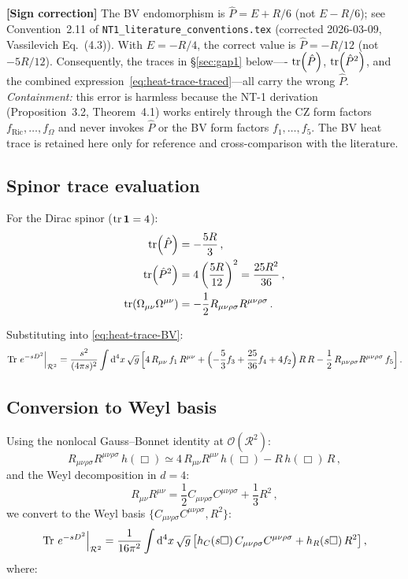 \documentclass[11pt,a4paper]{article}
\newcommand{\Id}{\mathbf{1}}
\newcommand{\Ricsq}{R_{\mu\nu}R^{\mu\nu}}
\newcommand{\Rsq}{R_{\mu\nu\rho\sigma}R^{\mu\nu\rho\sigma}}
\newcommand{\Weylsq}{C_{\mu\nu\rho\sigma}C^{\mu\nu\rho\sigma}}
\renewcommand{\dd}{\mathrm{d}}
\theoremstyle{definition}
\theoremstyle{remark}
\newcommand{\signcorrection}[1]{%
  \par\noindent\colorbox{red!10}{%
    \parbox{\dimexpr\linewidth-2\fboxsep}{%
      \textcolor{red!50!black}{\textbf{[Sign correction]}}
      \textcolor{red!50!black}{#1}%
    }%
  }\par%
}
\begin{document}
\signcorrection{%
  The BV endomorphism is $\hat{P} = E + R/6$ (not $E - R/6$);
  see Convention~2.11 of \texttt{NT1\_literature\_conventions.tex}
  (corrected 2026-03-09, Vassilevich Eq.~(4.3)).
  With $E = -R/4$, the correct value is
  $\hat{P} = -R/12$ (not $-5R/12$).
  Consequently, the traces in \S\ref{sec:gap1} below—-%
  $\tr(\hat{P})$, $\tr(\hat{P}^2)$, and the combined
  expression~\eqref{eq:heat-trace-traced}---all carry the wrong
  $\hat{P}$.
  \emph{Containment:} this error is harmless because the NT-1
  derivation (Proposition~3.2, Theorem~4.1) works entirely
  through the CZ form factors $f_{\mathrm{Ric}},\dots,f_\Omega$
  and never invokes $\hat{P}$ or the BV form factors $f_1,\dots,f_5$.
  The BV heat trace is retained here only for reference and
  cross-comparison with the literature.}

\subsection{Spinor trace evaluation}

For the Dirac spinor ($\tr\Id = 4$):
\begin{align}
  \tr(\hat{P}) &= -\frac{5R}{3}\,,
  \label{eq:tr-P}\\
  \tr(\hat{P}^2) &= 4\left(\frac{5R}{12}\right)^2 = \frac{25R^2}{36}\,,
  \label{eq:tr-P2}\\
  \tr(\Omega_{\mu\nu}\Omega^{\mu\nu})
  &= -\frac{1}{2}\Rsq\,.
  \label{eq:tr-OO}
\end{align}

Substituting into \eqref{eq:heat-trace-BV}:
\begin{equation}
  \Tr\,e^{-sD^2}\Big|_{\mathcal{R}^2}
  = \frac{s^2}{(4\pi s)^2}\int\dd^4x\,\sqrt{g}\,\Bigl[
  4\,R_{\mu\nu}\,f_1\,R^{\mu\nu}
  + \Bigl(-\frac{5}{3}f_3 + \frac{25}{36}f_4 + 4f_2\Bigr)\,R\,R
  - \frac{1}{2}\,\Rsq\,f_5
  \Bigr]\,.
  \label{eq:heat-trace-traced}
\end{equation}


\subsection{Conversion to Weyl basis}

Using the nonlocal Gauss--Bonnet identity at
$\mathcal{O}(\mathcal{R}^2)$:
\begin{equation}
  \Rsq\,h(\Box) \simeq 4\,\Ricsq\,h(\Box) - R\,h(\Box)\,R\,,
  \label{eq:GB-nonlocal}
\end{equation}
and the Weyl decomposition in $d=4$:
\begin{equation}
  \Ricsq = \frac{1}{2}\Weylsq + \frac{1}{3}R^2\,,
  \label{eq:weyl-decomp}
\end{equation}
we convert to the Weyl basis $\{\Weylsq, R^2\}$:
\begin{equation}
  \Tr\,e^{-sD^2}\Big|_{\mathcal{R}^2}
  = \frac{1}{16\pi^2}\int\dd^4x\,\sqrt{g}\,\bigl[
  h_C(s\Box)\,\Weylsq + h_R(s\Box)\,R^2
  \bigr]\,,
  \label{eq:heat-trace-weyl}
\end{equation}
where:
\end{document}
